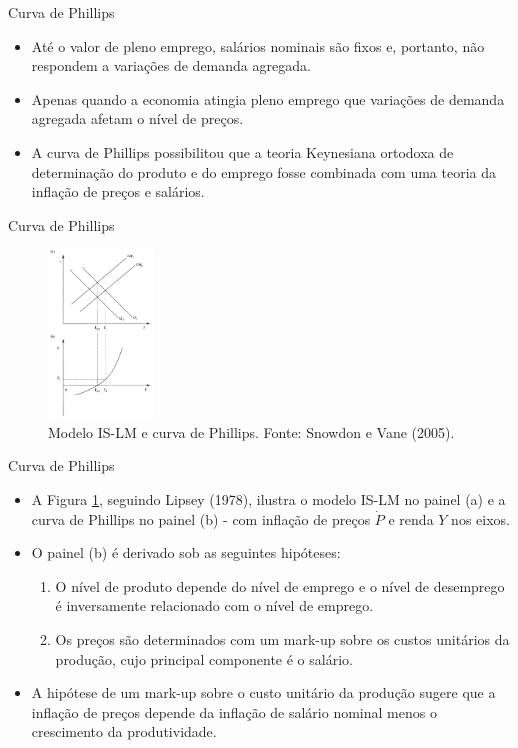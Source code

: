 \documentclass[10pt]{beamer}
\begin{document}
\begin{frame}{Curva de Phillips}
    \begin{itemize}
        \item Até o valor de pleno emprego, salários nominais são fixos e, portanto, não respondem a variações de demanda agregada.
        \bigskip
        \item Apenas quando a economia atingia pleno emprego que variações de demanda agregada afetam o nível de preços.
        \bigskip
        \item A curva de Phillips possibilitou que a teoria Keynesiana ortodoxa de determinação do produto e do emprego fosse combinada com uma teoria da inflação de preços e salários.
    \end{itemize}
\end{frame}

\begin{frame}{Curva de Phillips}
    \begin{figure}
        \centering
        \includegraphics[width=0.25\textwidth]{./figures/aula8_fig10.PNG}
        \caption{Modelo IS-LM e curva de Phillips. Fonte: Snowdon e Vane (2005).}
        \label{fig15}
    \end{figure}
\end{frame}

\begin{frame}{Curva de Phillips}
    \begin{itemize}
        \item A Figura  \ref{fig15}, seguindo Lipsey (1978), ilustra o modelo IS-LM no painel (a) e a curva de Phillips no painel (b) - com inflação de preços $\dot{P}$ e renda $Y$ nos eixos.
        \bigskip
        \item O painel (b) é derivado sob as seguintes hipóteses:
        \bigskip
        \begin{enumerate}
            \item O nível de produto depende do nível de emprego e o nível de desemprego é inversamente relacionado com o nível de emprego.
            \bigskip
            \item Os preços são determinados com um mark-up sobre os custos unitários da produção, cujo principal componente é o salário.
        \end{enumerate}
        \bigskip
        \item A hipótese de um mark-up sobre o custo unitário da produção sugere que a inflação de preços depende da inflação de salário nominal menos o crescimento da produtividade.
    \end{itemize}
\end{frame}
\end{document}

